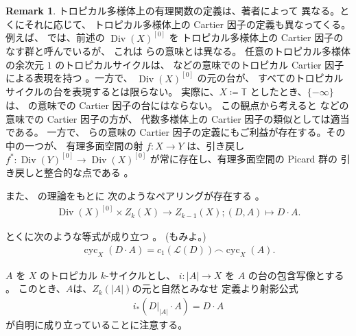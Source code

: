 \documentclass[a4paper,dvipdfmx,reqno,12pt]{amsart}
\theoremstyle{definition}
\newtheorem{remark}[theorem]{Remark}
\newcommand{\deq}{\coloneqq}
\newcommand{\opn}[1]{\operatorname{#1}}
\numberwithin{equation}{section}
\begin{document}
\begin{remark}
トロピカル多様体上の有理関数の定義は、著者によって
異なる。とくにそれに応じて、
トロピカル多様体上の Cartier 因子の定義も異なってくる。
例えば、\cite{MR3894860,MR4637248}
では、前述の $\opn{Div}(X)^{[0]}$ を
トロピカル多様体上の Cartier 因子のなす群と呼んでいるが、
これは \cite{demedrano2023chern} らの意味とは異なる。
任意のトロピカル多様体の余次元 $1$ のトロピカルサイクルは、
\cite{shaw2015tropical,demedrano2023chern}
などの意味でのトロピカル Cartier 因子による表現を持つ
\cite[Proposition 3.27]{shaw2015tropical}。一方で、
$\opn{Div}(X)^{[0]}$ の元の台が、
すべてのトロピカルサイクルの台を表現するとは限らない。
実際に、$X\deq \mathbb{T}$ としたとき、$\{-\infty\}$
は、\cite{MR3894860,MR4637248} の意味での
Cartier 因子の台にはならない。
この観点から考えると \cite{demedrano2023chern} などの
意味での Cartier 因子の方が、
代数多様体上の Cartier 因子の類似としては適当である。
一方で、\cite{MR3894860,MR4637248} らの意味の Cartier 
因子の定義にもご利益が存在する。その中の一つが、
有理多面空間の射 $f\colon X\to Y$ は、引き戻し
$f^{*}\colon \opn{Div}(Y)^{[0]} \to \opn{Div}(X)^{[0]}$
が常に存在し、有理多面空間の Picard 群の
引き戻しと整合的な点である
\cite[Propoisition 3.15]{MR4637248}。
\end{remark}

また、\cite{MR2591823} の理論をもとに
次のようなペアリングが存在する
\cite[]{MR4637248}。
\begin{align}
\label{equation-divisor-pairing}
\opn{Div}(X)^{[0]}\times Z_{k}(X)\to Z_{k-1}(X);
(D,A) \mapsto D\cdot A.
\end{align}

とくに次のような等式が成り立つ
\cite[Proposition 5.12]{MR4637248}。
(\cite[Theorem 4.15]{MR3894860}もみよ。)
\begin{align}
\opn{cyc}_X(D\cdot A)=c_1(\mathcal{L}(D))
\frown \opn{cyc}_X(A).
\end{align}

$A$ を $X$ のトロピカル $k$-サイクルとし、
$i\colon |A|\to X$ を $A$ の台の包含写像とする
\cite[Definition 3.5]{MR4637248}。
このとき、$A$は、$Z_k(|A|)$の元と自然とみなせ
定義より射影公式
\begin{align}
i_*(D|_{|A|}\cdot A)=D\cdot A
\end{align}
が自明に成り立っていることに注意する。
\end{document}
